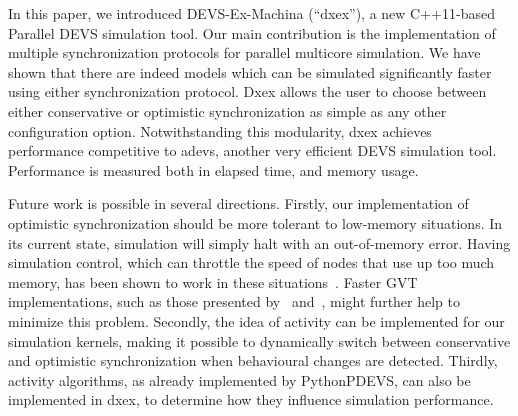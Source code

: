 In this paper, we introduced DEVS-Ex-Machina (``dxex''), a new C++11-based \textsf{Parallel DEVS} simulation tool.
Our main contribution is the implementation of multiple synchronization protocols for parallel multicore simulation.
We have shown that there are indeed models which can be simulated significantly faster using either synchronization protocol.
Dxex allows the user to choose between either conservative or optimistic synchronization as simple as any other configuration option.
Notwithstanding this modularity, dxex achieves performance competitive to adevs, another very efficient \textsf{DEVS} simulation tool.
Performance is measured both in elapsed time, and memory usage.

Future work is possible in several directions.
Firstly, our implementation of optimistic synchronization should be more tolerant to low-memory situations.
In its current state, simulation will simply halt with an out-of-memory error.
Having simulation control, which can throttle the speed of nodes that use up too much memory, has been shown to work in these situations~\cite{FujimotoBook}.
Faster GVT implementations, such as those presented by~\cite{Fujimoto:1997:CGV:268403.268404} and~\cite{Bauer:2005:SND:1069810.1070159}, might further help to minimize this problem.
Secondly, the idea of activity can be implemented for our simulation kernels, making it possible to dynamically switch between conservative and optimistic synchronization when behavioural changes are detected.
Thirdly, activity algorithms, as already implemented by PythonPDEVS, can also be implemented in dxex, to determine how they influence simulation performance.
